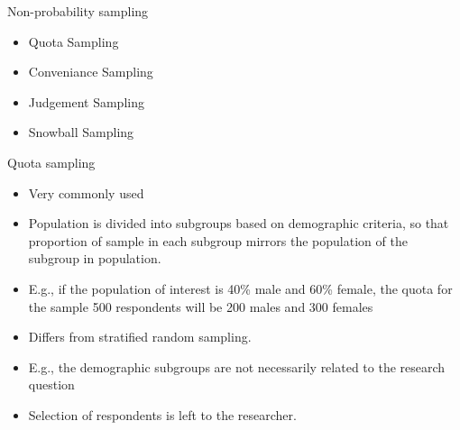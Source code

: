 \documentclass[10pt, compress]{beamer}
\begin{document}

\begin{frame}[t]{Non-probability sampling}
    \begin{itemize}
        \item Quota Sampling
        \item Conveniance Sampling
        \item Judgement Sampling
        \item Snowball Sampling
    \end{itemize}
\end{frame}

\begin{frame}[t]{Quota sampling}
    \begin{itemize}
        \item Very commonly used
        \item Population is divided into subgroups based on demographic criteria,
        so that proportion of sample in each subgroup mirrors the population of the
        subgroup in population.
        \item E.g., if the population of interest is 40\% male and 60\% female,
        the quota for the sample 500 respondents will be 200 males and 300 females
        \item Differs from stratified random sampling.
        \item E.g., the demographic subgroups are not necessarily related to the
        research question
        \item Selection of respondents is left to the researcher.
    \end{itemize}
\end{frame}
\end{document}
